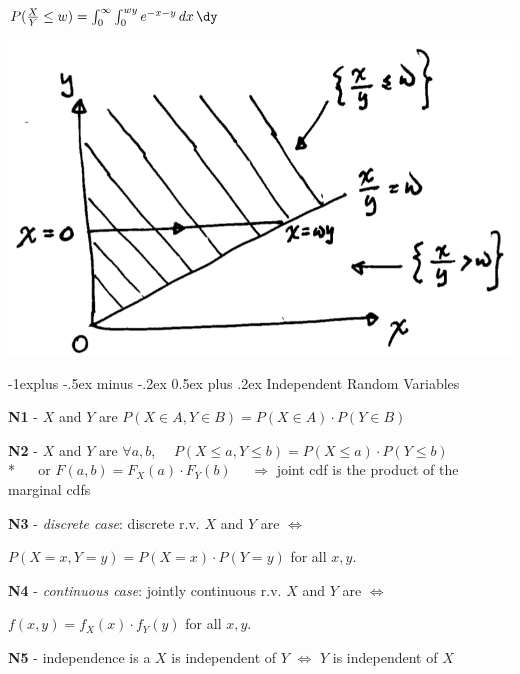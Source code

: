 \documentclass[10pt, landscape]{article}
\makeatletter
\renewcommand{\subsection}{\@startsection{subsection}{2}{0mm}%
  {-1explus -.5ex minus -.2ex}%
  {0.5ex plus .2ex}%
{\normalfont\normalsize\bfseries}}
\makeatother
\begin{document}
\begin{multicols*}{3}
\begin{minipage}[c]{0.55\linewidth}
\begin{niceproof}[ans]
      $P(\frac{X}{Y} \leq w) = \int^\infty_0 \int^{wy}_0 e^{-x-y} \dx \dy $
    \end{niceproof}
  \end{minipage}
  \begin{minipage}[c]{0.4\linewidth}
    \includegraphics[width=0.95\linewidth]{st2131-double-integral-eg-3.png} 
  \end{minipage}


  \subsection{Independent Random Variables}

  \textbf{N1} - $X$ and $Y$ are  $P(X \in A, Y \in B) = P(X \in A) \cdot P(Y \in B)$

  \textbf{N2} - $X$ and $Y$ are  $\forall a,b$, $\quad P(X \leq a, Y \leq b) = P(X \leq a) \cdot P(Y \leq b) $
  \\* $\quad$ or $F(a, b) = F_X(a) \cdot F_Y(b)$ $\quad \Rightarrow $ joint cdf is the product of the marginal cdfs

  \textbf{N3} - \textit{discrete case}: discrete r.v. $X$ and $Y$ are  $\iff$
  \begin{tightcenter}
    $P(X=x, Y=y) = P(X=x) \cdot P(Y=y)$ for all $x, y$.
  \end{tightcenter}

  \textbf{N4} - \textit{continuous case}: jointly continuous r.v. $X$ and $Y$ are  $\iff$
  \begin{tightcenter}
    $f(x, y) = f_X(x) \cdot f_Y(y)$ for all $x, y$.
  \end{tightcenter}

  \textbf{N5} - independence is a  $X$ is independent of $Y$ $\iff$ $Y$ is independent of $X$


\end{multicols*}
\end{document}
